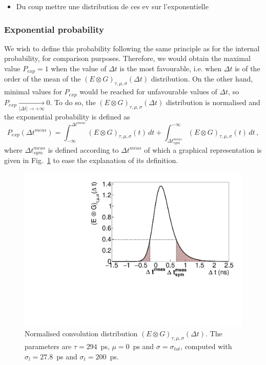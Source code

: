 \begin{itemize}
\item Du coup mettre une distribution de ces ev sur l'exponentielle
\end{itemize}

\subsubsection{Exponential probability}

We wish to define this probability following the same principle as for the internal probability, for comparison purposes.
Therefore, we would obtain the maximal value ${P_{exp}=1}$ when the value of $\Delta t$ is the most favourable, i.e. when $\Delta t$ is of the order of the mean of the ${(E \otimes G)_{\tau,\mu,\sigma}(\Delta t)}$ distribution.
On the other hand, minimal values for $P_{exp}$ would be reached for unfavourable values of $\Delta t$, so ${P_{exp} \xrightarrow[|\Delta t| \rightarrow +\infty]{} 0}$.
To do so, the ${(E \otimes G)_{\tau,\mu,\sigma}(\Delta t)}$ distribution is normalised and the exponential probability is defined as
\begin{equation}
  P_{exp}(\Delta t^{meas}) = \int_{-\infty}^{\Delta t^{meas}} (E \otimes G)_{\tau,\mu,\sigma}(t)\, dt + \int_{\Delta t_{sym}^{meas}}^{-\infty} (E \otimes G)_{\tau,\mu,\sigma}(t)\, dt\,,
  \label{eq:Pexp}
\end{equation}
where $\Delta t^{meas}_{sym}$ is defined according to $\Delta t^{meas}$ of which a graphical representation is given in Fig.~\ref{fig:Pexp} to ease the explanation of its definition.
\begin{figure}[!h]
  \centering
  \includegraphics[width=13cm]{timedifference/fig_timediff/proba_expo_test.pdf}
  \caption{Normalised convolution distribution ${(E \otimes G)_{\tau,\mu,\sigma}(\Delta t)}$.
    The parameters are $\tau=294$~ps, $\mu=0$~ps and $\sigma=\sigma_{tot}$, computed with $\sigma_{l}=27.8$~ps and $\sigma_{t}=200$~ps.
    \label{fig:Pexp}}
\end{figure}
